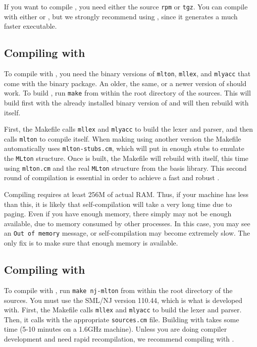 %
If you want to compile {\mlton}, you need either the source {\tt rpm}
or {\tt tgz}.  You can compile with either {\mlton} or {\smlnj}, but
we strongly recommend using {\mlton}, since it generates a much faster
executable.
%
\subsection{Compiling with {\mlton}}

To compile with {\mlton}, you need the binary versions of {\tt mlton},
{\tt mllex}, and {\tt mlyacc} that come with the {\mlton} binary
package.  An older, the same, or a newer version of {\mlton} should
work.  To build {\mlton}, run {\tt make} from within the root
directory of the sources.  This will build {\mlton} first with the
already installed binary version of {\mlton} and will then rebuild
{\mlton} with itself.

First, the Makefile calls {\tt mllex} and {\tt mlyacc} to build the
lexer and parser, and then calls {\tt mlton} to compile itself.  When
making {\mlton} using another version the Makefile automatically uses
{\tt mlton-stubs.cm}, which will put in enough stubs to emulate the
{\tt MLton} structure.  Once {\mlton} is built, the Makefile will
rebuild {\mlton} with itself, this time using {\tt mlton.cm} and the
real {\tt MLton} structure from the basis library.  This second round
of compilation is essential in order to achieve a fast and robust
{\mlton}.

Compiling {\mlton} requires at least 256M of actual RAM.  Thus, if
your machine has less than this, it is likely that self-compilation
will take a very long time due to paging.  Even if you have enough
memory, there simply may not be enough available, due to memory
consumed by other processes.  In this case, you may see an {\tt Out of
memory} message, or self-compilation may become extremely slow.  The
only fix is to make sure that enough memory is available.
%
\subsection{Compiling with {\smlnj}}

To compile with {\smlnj}, run {\tt make nj-mlton} from within the root
directory of the sources.  You must use the SML/NJ version 110.44,
which is what {\mlton} is developed with.  First, the Makefile calls
{\tt mllex} and {\tt mlyacc} to build the lexer and parser.  Then, it
calls {\smlnj} with the appropriate {\tt sources.cm} file.  Building
with {\smlnj} takes some time (5-10 minutes on a 1.6GHz machine).
Unless you are doing compiler development and need rapid
recompilation, we recommend compiling with {\mlton}.

